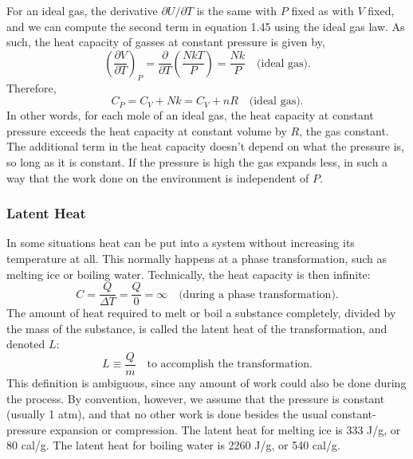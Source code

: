 \documentclass[11pt]{exam}
\begin{document}
\hspace*{10mm}For an ideal gas, the derivative $\partial U/\partial T$ is the same with $P$ fixed as with $V$ fixed, and we can compute the second term in equation 1.45 using the ideal gas law. As such, the heat capacity of gasses at constant pressure is given by, 
\begin{equation}\tag{1.47}
\left(\frac{\partial V}{\partial T}\right)_P = \frac{\partial}{\partial T}\left(\frac{NkT}{P}\right)=\frac{Nk}{P}\quad\text{(ideal gas)}.    
\end{equation}
Therefore, 
\begin{equation}\tag{1.48}
C_P = C_V + Nk = C_V + nR\quad\text{(ideal gas)}.    
\end{equation}
In other words, for each mole of an ideal gas, the heat capacity at constant pressure exceeds the heat capacity at constant volume by $R$, the gas constant. The additional term in the heat capacity doesn't depend on what the pressure is, so long as it is constant. If the pressure is high the gas expands less, in such a way that the work done on the environment is independent of $P$. 
\newpage
\subsubsection*{Latent Heat}
In some situations heat can be put into a system without increasing its temperature at all. This normally happens at a phase transformation, such as melting ice or boiling water. Technically, the heat capacity is then infinite:
\begin{equation}\tag{1.49}
C=\frac{Q}{\Delta T}=\frac{Q}{0}=\infty\quad\text{(during a phase transformation).}    
\end{equation}
The amount of heat required to melt or boil a substance completely, divided by the mass of the substance, is called the latent heat of the transformation, and denoted $L$:
\begin{equation}\tag{1.50}
L\equiv \frac{Q}{m}\quad\text{to accomplish the transformation.}
\end{equation}
This definition is ambiguous, since any amount of work could also be done during the process. By convention, however, we assume that the pressure is constant (usually 1 atm), and that no other work is done besides the usual constant-pressure expansion or compression. The latent heat for melting ice is 333 J/g, or 80 cal/g. The latent heat for boiling water is 2260 J/g, or 540 cal/g. 
\newpage
\end{document}
